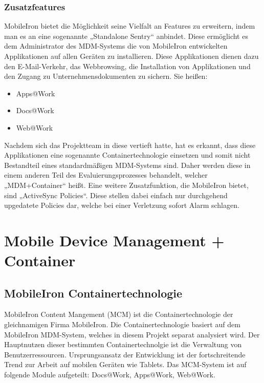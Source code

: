 \subsubsection{Zusatzfeatures}
MobileIron bietet die Möglichkeit seine Vielfalt an Features zu erweitern, indem man es an eine sogenannte „Standalone Sentry“ anbindet. Diese ermöglicht es dem Administrator des MDM-Systems die von MobileIron entwickelten Applikationen auf allen Geräten zu installieren. Diese Applikationen dienen dazu den E-Mail-Verkehr, das Webbrowsing, die Installation von Applikationen und den Zugang zu Unternehmensdokumenten zu sichern. Sie heißen:
\begin{itemize}
	\item Apps@Work
	\item Docs@Work
	\item Web@Work
\end{itemize}
Nachdem sich das Projektteam in diese vertieft hatte, hat es erkannt, dass diese Applikationen eine sogenannte Containertechnologie einsetzen und somit nicht Bestandteil eines standardmäßigen MDM-Systems sind. Daher werden diese in einem anderen Teil des Evaluierungsprozesses behandelt, welcher „MDM+Container“ heißt. Eine weitere Zusatzfunktion, die MobileIron bietet, sind „ActiveSync Policies“. Diese stellen dabei einfach nur durchgehend upgedatete Policies dar, welche bei einer Verletzung sofort Alarm schlagen.

\newpage
\section{Mobile Device Management + Container}
\subsection{MobileIron Containertechnologie}
MobileIron Content Mangement (MCM) ist die Containertechnologie der gleichnamigen Firma MobileIron. Die Containertechnologie basiert auf dem MobileIron MDM-System, welches in diesem Projekt separat analysiert wird. \newline
Der Hauptnutzen dieser bestimmten Containertechnolgie ist die Verwaltung von Benutzerressourcen. Ursprungsansatz der Entwicklung ist der fortschreitende Trend zur Arbeit auf mobilen Geräten wie Tablets. Das MCM-System ist auf folgende Module aufgeteilt: Docs@Work, Apps@Work, Web@Work.
